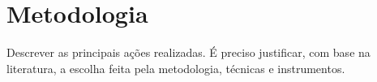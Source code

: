 \chapter{Metodologia}
Descrever as principais ações realizadas. É preciso justificar, com base na literatura, a escolha feita pela metodologia, técnicas e instrumentos.


